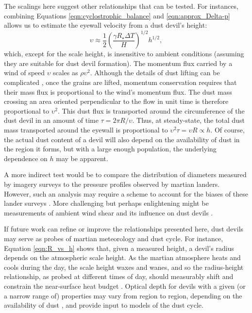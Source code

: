 \documentclass{aastex63}
\begin{document}
The scalings here suggest other relationships that can be tested. For instances, combining Equations \ref{eqn:cyclostrophic_balance} and \ref{eqn:approx_Delta-p} allows us to estimate the eyewall velocity from a dust devil's height:
\begin{equation}
    \upsilon \approx \frac{1}{2} \left( \dfrac{\gamma R_\star \Delta T}{H} \right)^{1/2} h^{1/2},\label{eqn:velocity_vs_h}
\end{equation}
which, except for the scale height, is insensitive to ambient conditions (assuming they are suitable for dust devil formation). The momentum flux carried by a wind of speed $\upsilon$ scales as $\rho \upsilon^2$. Although the details of dust lifting can be complicated \citep[e.g.][]{1985wagp.book.....G}, once the grains are lifted, momentum conservation requires that their mass flux is proportional to the wind's momentum flux. The dust mass crossing an area oriented perpendicular to the flow in unit time is therefore proportional to $\upsilon^2$. This dust flux is transported around the circumference of the dust devil in an amount of time $\tau = 2\pi R/\upsilon$. Thus, at steady-state, the total dust mass transported around the eyewall is proportional to $\upsilon^2\tau = \upsilon R \propto h$. Of course, the actual dust content of a devil will also depend on the availability of dust in the region it forms, but with a large enough population, the underlying dependence on $h$ may be apparent. 

A more indirect test would be to compare the distribution of diameters measured by imagery surveys to the pressure profiles observed by martian landers. However, such an analysis may require a scheme to account for the biases of these lander surveys \citep{2018Icar..299..166J, 2019Icar..317..209K}. More challenging but perhaps enlightening might be measurements of ambient wind shear and its influence on dust devils \citep{arya1988}.

If future work can refine or improve the relationships presented here, dust devils may serve as probes of martian meteorology and dust cycle. For instance, Equation \ref{eqn:R_vs_h} shows that, given a measured height, a devil's radius depends on the atmospheric scale height. As the martian atmosphere heats and cools during the day, the scale height waxes and wanes, and so the radius-height relationship, as probed at different times of day, should measurably shift and constrain the near-surface heat budget \citep{Martinez2017}. Optical depth for devils with a given (or a narrow range of) properties may vary from region to region, depending on the availability of dust \citep{2002JGRE..107.5042B}, and provide input to models of the dust cycle.
\end{document}
